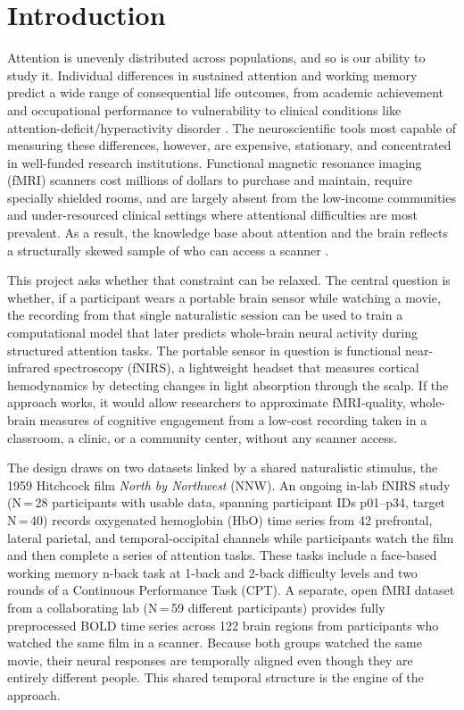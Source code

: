 
\section{Introduction}

Attention is unevenly distributed across populations, and so is our ability to study it. Individual differences in sustained attention and working memory predict a wide range of consequential life outcomes, from academic achievement and occupational performance to vulnerability to clinical conditions like attention-deficit/hyperactivity disorder \citep{kofler2013}. The neuroscientific tools most capable of measuring these differences, however, are expensive, stationary, and concentrated in well-funded research institutions. Functional magnetic resonance imaging (fMRI) scanners cost millions of dollars to purchase and maintain, require specially shielded rooms, and are largely absent from the low-income communities and under-resourced clinical settings where attentional difficulties are most prevalent. As a result, the knowledge base about attention and the brain reflects a structurally skewed sample of who can access a scanner \citep{farah2006}.

This project asks whether that constraint can be relaxed. The central question is whether, if a participant wears a portable brain sensor while watching a movie, the recording from that single naturalistic session can be used to train a computational model that later predicts whole-brain neural activity during structured attention tasks. The portable sensor in question is functional near-infrared spectroscopy (fNIRS), a lightweight headset that measures cortical hemodynamics by detecting changes in light absorption through the scalp. If the approach works, it would allow researchers to approximate fMRI-quality, whole-brain measures of cognitive engagement from a low-cost recording taken in a classroom, a clinic, or a community center, without any scanner access.

The design draws on two datasets linked by a shared naturalistic stimulus, the 1959 Hitchcock film \textit{North by Northwest} (NNW). An ongoing in-lab fNIRS study (N\,=\,28 participants with usable data, spanning participant IDs p01--p34, target N\,=\,40) records oxygenated hemoglobin (HbO) time series from 42 prefrontal, lateral parietal, and temporal-occipital channels while participants watch the film and then complete a series of attention tasks. These tasks include a face-based working memory n-back task at 1-back and 2-back difficulty levels and two rounds of a Continuous Performance Task (CPT). A separate, open fMRI dataset from a collaborating lab (N\,=\,59 different participants) provides fully preprocessed BOLD time series across 122 brain regions from participants who watched the same film in a scanner. Because both groups watched the same movie, their neural responses are temporally aligned even though they are entirely different people. This shared temporal structure is the engine of the approach.

